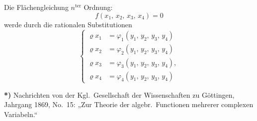 \documentclass{article}
\begin{document}
Die Flächengleichung $n^{\text{ter}}$ Ordnung:
\[
f(x_1,\, x_2,\, x_3,\, x_4) = 0 \tag{1}
\]
werde durch die rationalen Substitutionen
\[
\left\{
\begin{aligned}
\varrho x_1 &= \varphi_1 (y_1,\, y_2,\, y_3,\, y_4) \\
\varrho x_2 &= \varphi_2 (y_1,\, y_2,\, y_3,\, y_4) \\
\varrho x_3 &= \varphi_3 (y_1,\, y_2,\, y_3,\, y_4), \\
\varrho x_4 &= \varphi_4 (y_1,\, y_2,\, y_3,\, y_4)
\end{aligned}
\right. \tag{2}
\]

\textbf{*)} Nachrichten von der Kgl.~Gesellschaft der Wissenschaften zu Göttingen, Jahrgang 1869, No.~15: „Zur Theorie der algebr.~Functionen mehrerer complexen Variabeln.“
\end{document}
